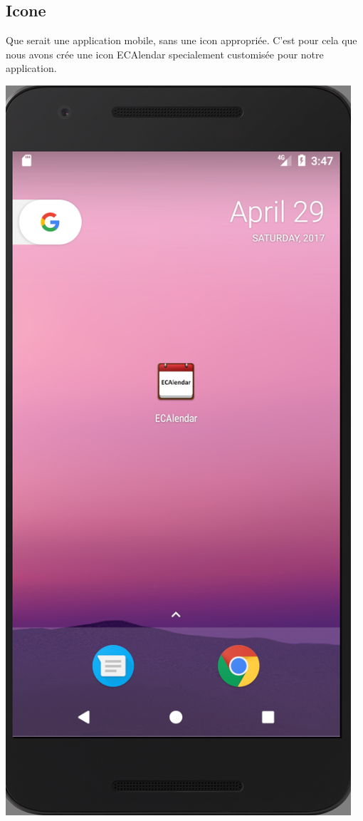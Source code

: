 \documentclass{article}
\begin{document}
	\subsection{Icone}
	 Que serait une application mobile, sans une icon appropri\'ee. C'est pour cela que nous avons cr\'ee une icon ECAlendar specialement customis\'ee pour notre application.
	   \begin{center}
            \includegraphics[scale=0.4]{img/ICON.png}
        \end{center}
\end{document}
